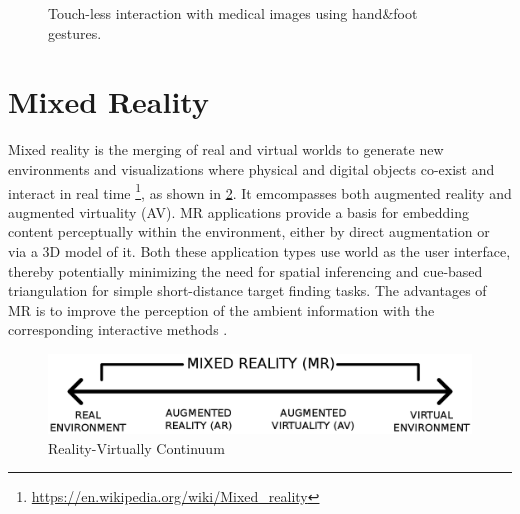 \begin{figure}
	\centering
	\qquad
	\caption{Touch-less interaction with medical images using hand\&foot gestures.}
	\label{fig:2-bg:HandFootGesture}
\end{figure}

\section{Mixed Reality}
Mixed reality is the merging of real and virtual worlds to generate new environments and visualizations where physical and digital objects co-exist and interact in real time \footnote{\url{https://en.wikipedia.org/wiki/Mixed_reality}}, as shown in \figurename{\ref{fig:2-bg:Reality-Virtuality_Continuum}}. It emcompasses both augmented reality and augmented virtuality (AV).
MR applications provide a basis for embedding content perceptually within the environment, either by direct augmentation or via a 3D model of it. Both these application types use world as the user interface, thereby potentially minimizing the need for spatial inferencing and cue-based triangulation for simple short-distance target finding tasks. The advantages of MR is to improve the perception of the ambient information with the corresponding interactive methods \cite{Nurminen}. 
\begin{figure}
\centering
\includegraphics[width=0.8\linewidth]{figures/2-bg/Reality-Virtuality_Continuum}
\caption{Reality-Virtually Continuum}
\label{fig:2-bg:Reality-Virtuality_Continuum}
\end{figure}

